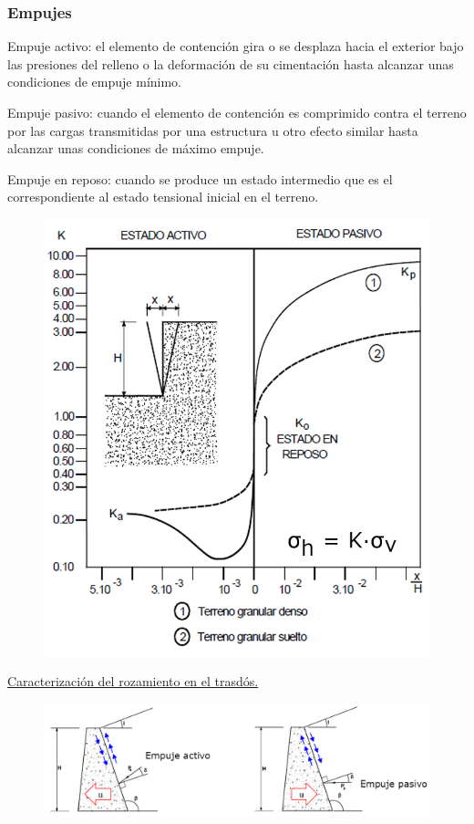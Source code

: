 \subsubsection{Empujes}
Empuje activo: el elemento de contención gira o se desplaza hacia el exterior bajo las presiones del relleno o la deformación de su cimentación hasta alcanzar unas condiciones de empuje mínimo.

Empuje pasivo: cuando el elemento de contención es comprimido contra el terreno por las cargas transmitidas por una estructura u otro efecto similar hasta alcanzar unas condiciones de máximo empuje.

Empuje en reposo: cuando se produce un estado intermedio que es el correspondiente al estado tensional inicial en el terreno.

\begin{figure}[H]
    \centering
    \includegraphics[width = 0.75 \linewidth]{Imagenes/Estructuras de contencion - Estados de empuje.png}
\end{figure}

\noindent \underline{Caracterización del rozamiento en el trasdós.}

\begin{figure}[H]
    \centering
    \includegraphics[width = 1 \linewidth]{Imagenes/Estructuras de contencion - caracterizacion del rozamiento en el trasdos.png}
\end{figure}

